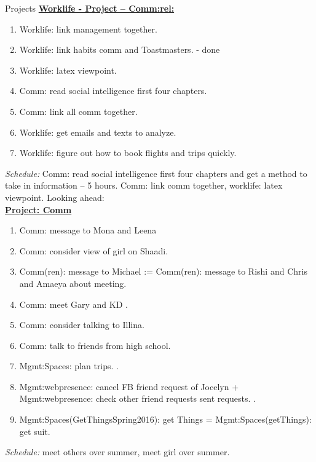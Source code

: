 \begin{block}{Projects}
{\underline{\textbf{Worklife - Project – Comm:rel:}}}
\begin{enumerate} 
  \tiny \item \tiny Worklife: link management together.  
\item \tiny Worklife: link habits comm and Toastmasters. - done
\item \tiny Worklife: latex viewpoint. 
\item \tiny Comm: read social intelligence first four chapters.
\item \tiny Comm: link all comm together.
\item \tiny Worklife: get emails and texts to analyze. 
\item \tiny Worklife: figure out how to book flights and trips quickly. 
\end{enumerate}
\textit{Schedule:} Comm: read social intelligence first four chapters
and get a method to take in information – 5 hours. Comm: link comm
together, worklife: latex viewpoint. Looking ahead:  \\

{\underline{\bf Project: Comm}}
\begin{enumerate}
  \tiny \item \tiny Comm: message to Mona and Leena  
\item \tiny Comm: consider view of girl on Shaadi. 
\item \tiny Comm(ren): message to Michael :=  Comm(ren): message to
  Rishi and Chris and Amaeya about meeting. 
\item \tiny Comm: meet Gary and KD .
  \pr{-}
\item \tiny Comm: consider talking to Illina.
\item \tiny Comm: talk to friends from high school.
\item \tiny Mgmt:Spaces: plan trips. \te{-}.
\item \tiny Mgmt:webpresence: cancel FB friend request of
  Jocelyn + Mgmt:webpresence: check other friend requests
  sent requests. \te{-}.
\item \tiny Mgmt:Spaces(GetThingsSpring2016): get Things =
  Mgmt:Spaces(getThings): get suit. 

\end{enumerate}
{\it Schedule:} meet others over summer, meet girl over summer.\\


\end{block}
